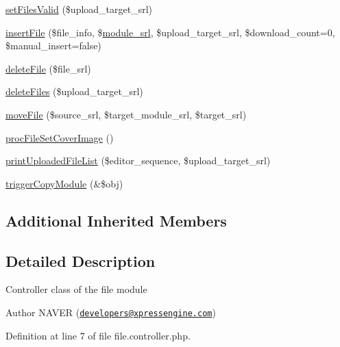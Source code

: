 \begin{DoxyCompactItemize}
\item 
\hyperlink{classfileController_a801efe17bf09b43279f82504b748c5ee}{set\-Files\-Valid} (\$upload\-\_\-target\-\_\-srl)
\item 
\hyperlink{classfileController_aa9247b382342e097dcd71dac7b944c50}{insert\-File} (\$file\-\_\-info, \$\hyperlink{ko_8install_8php_a370bb6450fab1da3e0ed9f484a38b761}{module\-\_\-srl}, \$upload\-\_\-target\-\_\-srl, \$download\-\_\-count=0, \$manual\-\_\-insert=false)
\item 
\hyperlink{classfileController_a98775c010ad21e88fd590c0a35b9c405}{delete\-File} (\$file\-\_\-srl)
\item 
\hyperlink{classfileController_ae3060e078930eeaae0c939d7a1c4f229}{delete\-Files} (\$upload\-\_\-target\-\_\-srl)
\item 
\hyperlink{classfileController_aae914224f7bc02d907004c3fb1dd29ac}{move\-File} (\$source\-\_\-srl, \$target\-\_\-module\-\_\-srl, \$target\-\_\-srl)
\item 
\hyperlink{classfileController_a54e65e695efa22b2a9507fd52e44d601}{proc\-File\-Set\-Cover\-Image} ()
\item 
\hyperlink{classfileController_a99cefbd1c15aeb48b68903e77f9041c7}{print\-Uploaded\-File\-List} (\$editor\-\_\-sequence, \$upload\-\_\-target\-\_\-srl)
\item 
\hyperlink{classfileController_a043759003f14e91db0f4fb554955fba8}{trigger\-Copy\-Module} (\&\$obj)
\end{DoxyCompactItemize}
\subsection*{Additional Inherited Members}


\subsection{Detailed Description}
Controller class of the file module \begin{DoxyAuthor}{Author}
N\-A\-V\-E\-R (\href{mailto:developers@xpressengine.com}{\tt developers@xpressengine.\-com}) 
\end{DoxyAuthor}


Definition at line 7 of file file.\-controller.\-php.



